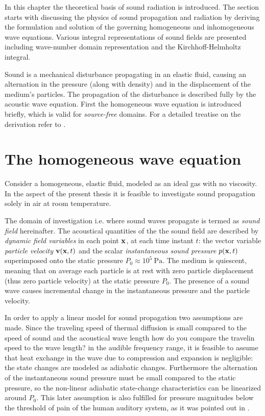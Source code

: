 In this chapter the theoretical basis of sound radiation is introduced. The section starts with discussing the physics of sound propagation and radiation by deriving the formulation and solution of the governing homogeneous and inhomogeneous wave equations. Various integral representations of sound fields are presented including wave-number domain representation and the Kirchhoff-Helmholtz integral.
%

\vspace{3mm}
Sound is a mechanical disturbance propagating in an elastic fluid, causing an alternation in the pressure (along with density) and in the displacement of the medium's particles. The propagation of the disturbance is described fully by the acoustic wave equation. First the homogeneous wave equation is introduced briefly, which is valid for \emph{source-free} domains. For a detailed treatise on the derivation refer to \cite{Beranek1993, Morse1968, Williams1999, Blackstock2000}.

\section{The homogeneous wave equation}

Consider a homogeneous, elastic fluid, modeled as an ideal gas with no viscosity. In the aspect of the present thesis it is feasible to investigate sound propagation solely in air at room temperature.

%
The domain of investigation i.e. where sound waves propagate is termed as \emph{sound field} hereinafter.
The acoustical quantities of the the sound field are described by \emph{dynamic field variables} in each point $\mathbf{x}$, at each time instant $t$: the vector variable \emph{particle velocity} $\mathbf{v}(\mathbf{x},t)$ and the scalar \emph{instantaneous sound pressure} $p(\mathbf{x},t)$ superimposed onto the static pressure $P_0 \approx 10^5~\mathrm{Pa}$.
The medium is quiescent, meaning that on average each particle is at rest with zero particle displacement (thus zero particle velocity) at the static pressure $P_0$. 
The presence of a sound wave causes incremental change in the instantaneous pressure and the particle velocity.
%

In order to apply a linear model for sound propagation two assumptions are made.
Since the traveling speed of thermal diffusion is small compared to the speed of sound and the acoustical wave length {\color{red} how do you compare the travelin speed to the wave length?} in the audible frequency range, it is feasible to assume that heat exchange in the wave due to compression and expansion is negligible: the state changes are modeled as adiabatic changes.
Furthermore the alternation of the instantaneous sound pressure must be small compared to the static pressure, so the non-linear adiabatic state-change characteristics can be linearized around $P_0$. This later assumption is also fulfilled for pressure magnitudes below the threshold of pain of the human auditory system, as it was pointed out in \cite{Gumerov2004, Ahrens2012}.
%

